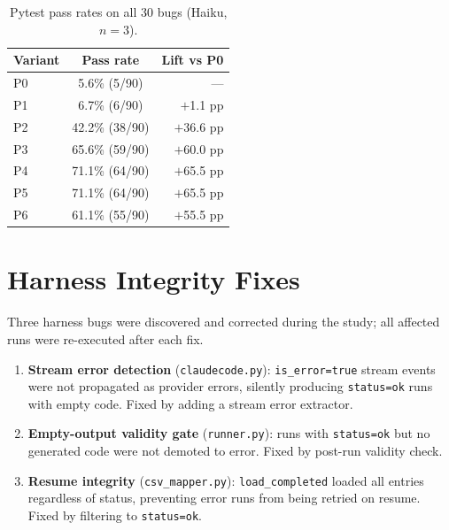 \documentclass[10pt,a4paper,twocolumn]{article}
\begin{document}
\begin{table}[h!]
\centering
\caption{Pytest pass rates on all 30 bugs (Haiku, $n{=}3$).}
\label{tab:all-bugs}
\small
\begin{tabular}{@{}lcr@{}}
\toprule
\textbf{Variant} & \textbf{Pass rate} & \textbf{Lift vs P0} \\
\midrule
P0 & 5.6\% (5/90)   & ---        \\
P1 & 6.7\% (6/90)   & $+$1.1 pp  \\
P2 & 42.2\% (38/90) & $+$36.6 pp \\
P3 & 65.6\% (59/90) & $+$60.0 pp \\
P4 & 71.1\% (64/90) & $+$65.5 pp \\
P5 & 71.1\% (64/90) & $+$65.5 pp \\
P6 & 61.1\% (55/90) & $+$55.5 pp \\
\bottomrule
\end{tabular}
\end{table}

\section{Harness Integrity Fixes}
\label{app:harness-fixes}

Three harness bugs were discovered and corrected during the study;
all affected runs were re-executed after each fix.

\begin{enumerate}
    \item \textbf{Stream error detection} (\texttt{claudecode.py}):
    \texttt{is\_error=true} stream events were not propagated as provider
    errors, silently producing \texttt{status=ok} runs with empty code.
    Fixed by adding a stream error extractor.

    \item \textbf{Empty-output validity gate} (\texttt{runner.py}):
    runs with \texttt{status=ok} but no generated code were not demoted
    to error. Fixed by post-run validity check.

    \item \textbf{Resume integrity} (\texttt{csv\_mapper.py}):
    \texttt{load\_completed} loaded all entries regardless of status,
    preventing error runs from being retried on resume.
    Fixed by filtering to \texttt{status=ok}.
\end{enumerate}

\end{document}
